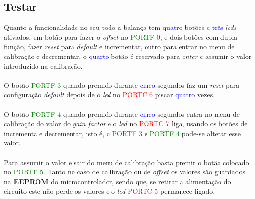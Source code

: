 \subsection{Testar}
Quanto a funcionalidade no seu todo a balança tem \textcolor{blue}{quatro} botões e \textcolor{blue}{três} \textit{leds} ativados, um botão para fazer o \textit{offset} no \textcolor{green}{PORTF 0}, e dois botões com dupla função, fazer \textit{reset} para \textit{default} e incrementar, outro para entrar no menu de calibração e decrementar, o \textcolor{blue}{quarto} botão é reservado para \textit{enter} e assumir o valor introduzido na calibração.\\
\\
O botão \textcolor{green}{PORTF 3} quando premido durante \textcolor{blue}{cinco} segundos faz um \textit{reset} para configuração \textit{default} depois de o \textit{led} no \textcolor{red}{PORTC 6} piscar \textcolor{blue}{quatro} vezes.\\
\\
O botão \textcolor{green}{PORTF 4} quando premido durante \textcolor{blue}{cinco} segundos entra no menu de calibração do valor do \textit{gain factor} e o \textit{led} no \textcolor{red}{PORTC 7} liga, usando os botões de incrementa e decrementar, isto é, o
\textcolor{green}{PORTF 3} e \textcolor{green}{PORTF 4} pode-se alterar esse valor.\\
\\
Para assumir o valor e sair do menu de calibração basta premir o botão colocado no \textcolor{green}{PORTF 5}. Tanto no caso de calibração ou de \textit{offset} os valores são guardados na \textbf{EEPROM} do microcontrolador, sendo que, se retirar a alimentação do circuito este não perde os valores e o \textit{led} \textcolor{red}{PORTC 5} permanece ligado.
\\
\\

